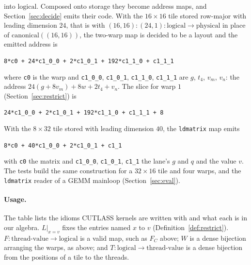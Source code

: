 \documentclass[11pt]{article}
\theoremstyle{definition}
\newcommand{\logical}{\textrm{logical}}
\newcommand{\physical}{\textrm{physical}}
\newcommand{\tv}{\textrm{thread-value}}
\begin{document}
into $\logical$. Composed onto storage they become address maps, and
Section~\ref{sec:decide} emits their code. With the $16 \times 16$ tile
stored row-major with leading dimension $24$, that is with
$(16,16){:}(24,1) : \logical \to \physical$ in place of
$\mathrm{canonical}((16,16))$, the two-warp map is decided to be a layout and
the emitted address is
\begin{center}
\verb|8*c0 + 24*c1_0_0 + 2*c1_0_1 + 192*c1_1_0 + c1_1_1|
\end{center}
where \verb|c0| is the warp and \verb|c1_0_0|, \verb|c1_0_1|,
\verb|c1_1_0|, \verb|c1_1_1| are $g$, $t_4$, $v_m$, $v_n$: the address
$24(g + 8v_m) + 8w + 2t_4 + v_n$. The slice for warp $1$
(Section~\ref{sec:restrict}) is
\begin{center}
\verb|24*c1_0_0 + 2*c1_0_1 + 192*c1_1_0 + c1_1_1 + 8|
\end{center}
With the $8 \times 32$ tile stored with leading dimension $40$, the
\texttt{ldmatrix} map emits
\begin{center}
\verb|8*c0 + 40*c1_0_0 + 2*c1_0_1 + c1_1|
\end{center}
with \verb|c0| the matrix and \verb|c1_0_0|, \verb|c1_0_1|, \verb|c1_1|
the lane's $g$ and $q$ and the value $v$. The tests build the same
construction for a $32 \times 16$ tile and four warps, and the
\texttt{ldmatrix} reader of a GEMM mainloop (Section~\ref{sec:eval}).

\paragraph{Usage.} The table lists the idioms CUTLASS kernels are written
with and what each is in our algebra. $L|_{x = v}$ fixes the entries named
$x$ to $v$ (Definition~\ref{def:restrict}). $F : \tv \to \logical$ is a valid
map, such as $F_C$ above; $W$ is a dense bijection arranging the warps, as
above; and $T : \logical \to \tv$ is a dense bijection from the positions of
a tile to the threads.
\end{document}

